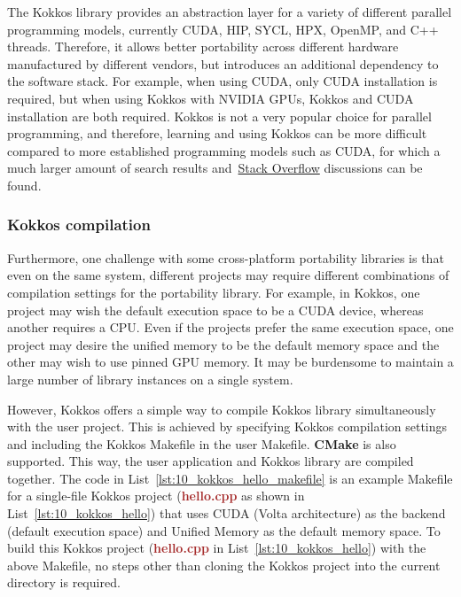 \par
The Kokkos library provides an abstraction layer for a variety of different parallel programming models, currently CUDA, HIP, SYCL, HPX, OpenMP, and C++ threads.
Therefore, it allows better portability across different hardware manufactured by different vendors, but introduces an additional dependency to the software stack.
For example, when using CUDA, only CUDA installation is required, but when using Kokkos with NVIDIA GPUs, Kokkos and CUDA installation are both required.
Kokkos is not a very popular choice for parallel programming, and therefore, learning and using Kokkos can be more difficult compared to more established programming models such as CUDA, for which a much larger amount of search results and~\href{https://stackoverflow.com/}{Stack Overflow} discussions can be found.


\subsubsection{Kokkos compilation}


\par
Furthermore, one challenge with some cross-platform portability libraries is that even on the same system, different projects may require different combinations of compilation settings for the portability library.
For example, in Kokkos, one project may wish the default execution space to be a CUDA device, whereas another requires a CPU.
Even if the projects prefer the same execution space, one project may desire the unified memory to be the default memory space and the other may wish to use pinned GPU memory. 
It may be burdensome to maintain a large number of library instances on a single system.


\par
However, Kokkos offers a simple way to compile Kokkos library simultaneously with the user project.
This is achieved by specifying Kokkos compilation settings~\cite{kokkos_compiling} and including the Kokkos Makefile in the user Makefile.
\textbf{CMake} is also supported.
This way, the user application and Kokkos library are compiled together.
The code in List~\ref{lst:10_kokkos_hello_makefile} is an example Makefile for a single-file Kokkos project (\textbf{\textcolor{brown}{hello.cpp}} as shown in List~\ref{lst:10_kokkos_hello}) that uses CUDA (Volta architecture) as the backend (default execution space) and Unified Memory as the default memory space.
To build this Kokkos project (\textbf{\textcolor{brown}{hello.cpp}} in List~\ref{lst:10_kokkos_hello}) with the above Makefile, no steps other than cloning the Kokkos project into the current directory is required.


